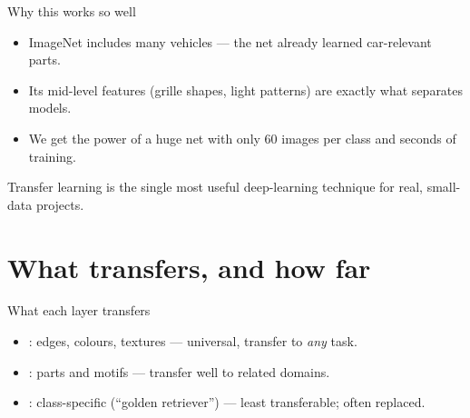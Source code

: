 \documentclass[10pt,aspectratio=169]{beamer}
\begin{document}
\begin{frame}{Why this works so well}
  \begin{itemize}
    \item ImageNet includes many vehicles — the net already learned car-relevant parts.
    \item Its mid-level features (grille shapes, light patterns) are exactly what separates models.
    \item We get the power of a huge net with only 60 images per class and seconds of training.
  \end{itemize}
  \begin{goodbox}
    Transfer learning is the single most useful deep-learning technique for real, small-data projects.
  \end{goodbox}
\end{frame}

\section{What transfers, and how far}

\begin{frame}{What each layer transfers}
  \begin{itemize}
    \item {}: edges, colours, textures — universal, transfer to \emph{any} task.
    \item {}: parts and motifs — transfer well to related domains.
    \item {}: class-specific (``golden retriever'') — least transferable; often replaced.
  \end{itemize}
\end{frame}
\end{document}
